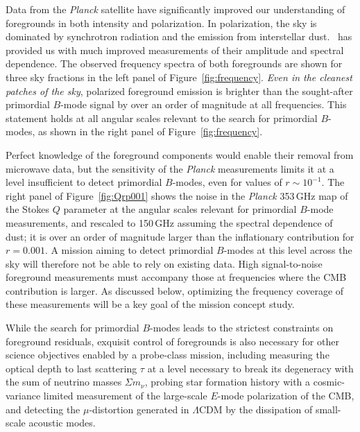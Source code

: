 Data from the \emph{Planck} satellite have significantly improved our
understanding of foregrounds in both intensity and polarization.
In polarization, the sky is dominated by synchrotron radiation and the emission from interstellar dust. \planck\ has provided us with much
improved measurements of their amplitude and spectral dependence. The
observed frequency spectra of both foregrounds are shown for three sky
fractions in the left panel of Figure~\ref{fig:frequency}.  \emph{Even
  in the cleanest patches of the sky}, polarized foreground emission
is brighter than the sought-after primordial $B$-mode signal by over
an order of magnitude at all frequencies.  This statement holds at all
angular scales relevant to the search for primordial $B$-modes, as
shown in the right panel of Figure~\ref{fig:frequency}.

Perfect knowledge of the foreground components would enable their
removal from microwave data, but the sensitivity of the \emph{Planck}
measurements limits it at a level insufficient to detect primordial
$B$-modes, even for values of $r\!\sim\!10^{-1}$. The right panel of
Figure~\ref{fig:Qrp001} shows the noise in the \emph{Planck} 353\,GHz
map of the Stokes $Q$ parameter at the angular scales relevant for
primordial $B$-mode measurements, and rescaled to 150\,GHz assuming
the spectral dependence of dust; it is over an order of magnitude
larger than the inflationary contribution for $r=0.001$.  A mission
aiming to detect primordial $B$-modes at this level across the sky
will therefore not be able to rely on existing data. High
signal-to-noise foreground measurements must accompany those at
frequencies where the CMB contribution is larger.  As discussed below,
optimizing the frequency coverage of these measurements will be a key
goal of the mission concept study.

While the search for primordial $B$-modes leads to the strictest
constraints on foreground residuals, exquisit control of foregrounds
is also necessary for other science objectives enabled by a
probe-class mission, including measuring the optical depth to last
scattering $\tau$ at a level necessary to break its degeneracy with
the sum of neutrino masses $\Sigma m_\nu$, probing star formation
history with a cosmic-variance limited measurement of the large-scale
$E$-mode polarization of the CMB, and detecting the $\mu$-distortion
generated in $\Lambda$CDM by the dissipation of small-scale acoustic
modes.

